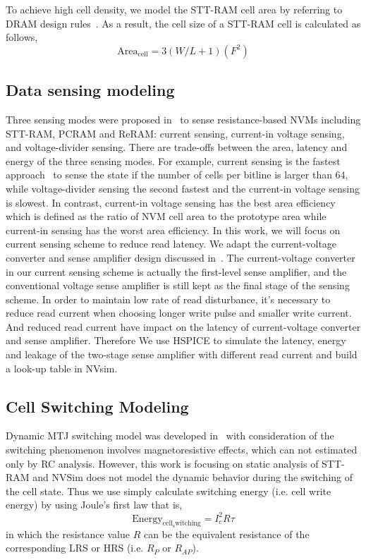 To achieve high cell density, we model the STT-RAM cell area by referring to DRAM design rules~\cite{DRAM:6F2}.  As a result, the cell size of a STT-RAM cell is calculated as follows,
\begin{equation}
\mathrm{Area}_{\mathrm{cell}}={3\left(W/L+1\right)}(F^2)
\end{equation}

\subsection{Data sensing modeling}
Three sensing modes were proposed in~\cite{CACTI:DATE11:Xu} to sense resistance-based NVMs including STT-RAM, PCRAM and ReRAM: current sensing, current-in voltage sensing, and voltage-divider sensing. There are trade-offs between the area, latency and energy of the three sensing modes. For example, current sensing is the fastest approach~\cite{RRAM:ITRI11} to sense the state if the number of cells per bitline is larger than 64, while voltage-divider sensing the second fastest and the current-in voltage sensing is slowest. In contrast, current-in voltage sensing has the best area efficiency which is defined as the ratio of NVM cell area to the prototype area while current-in sensing has the worst area efficiency. In this work, we will focus on current sensing scheme to reduce read latency. We adapt the current-voltage converter and sense amplifier design discussed in~\cite{CACTI:DAC08:Dong}. The current-voltage converter in our current sensing scheme is actually the first-level sense amplifier, and the conventional voltage sense amplifier is still kept as the final stage of the sensing scheme. In order to maintain low rate of read disturbance, it's necessary to reduce read current when choosing longer write pulse and smaller write current. And reduced read current have impact on the latency of current-voltage converter and sense amplifier. Therefore We use HSPICE to simulate the latency, energy and leakage of the two-stage sense amplifier with different read current and build a look-up table in NVsim.

\subsection{Cell Switching Modeling}
Dynamic MTJ switching model was developed in~\cite{STTRAM:Purdue10} with consideration of the switching phenomenon involves magnetoresistive effects, which can not estimated only by RC analysis.  However, this work is focusing on static analysis of STT-RAM and NVSim does not model the dynamic behavior during the switching of the cell state. Thus we use simply calculate switching energy (i.e. cell write energy) by using Joule's first law that is,
\begin{equation}
\mathrm{Energy}_{\mathrm{cell_switching}} = I_{c}^2 R \tau
\end{equation}
in which the resistance value $R$ can be the equivalent resistance of the corresponding LRS or HRS (i.e. $R_{P}$ or $R_{AP}$).

 